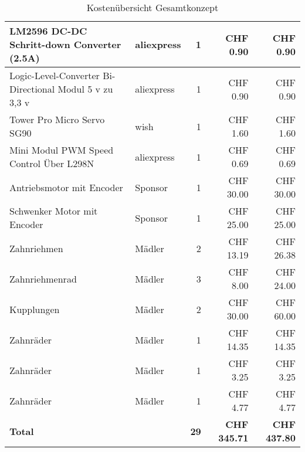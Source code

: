\documentclass[../../main.tex]{subfiles}
\begin{document}
\begin{table}[H]
\begin{tabular}{|p{6cm}|l|r|r|r|}
    LM2596 DC-DC Schritt-down Converter (2.5A)              & aliexpress         & 1               & CHF 0.90            & CHF 0.90              \\ \hline 
    Logic-Level-Converter Bi-Directional Modul 5 v zu 3,3 v & aliexpress         & 1               & CHF 0.90            & CHF 0.90              \\ \hline 
    Tower Pro Micro Servo SG90                              & wish               & 1               & CHF 1.60            & CHF 1.60              \\ \hline 
    Mini Modul PWM Speed Control Über L298N                 & aliexpress         & 1               & CHF 0.69            & CHF 0.69              \\ \hline 
    Antriebsmotor mit Encoder                               & Sponsor            & 1               & CHF 30.00           & CHF 30.00             \\ \hline 
    Schwenker Motor mit Encoder                             & Sponsor            & 1               & CHF 25.00           & CHF 25.00             \\ \hline 
    Zahnriehmen                                             & Mädler             & 2               & CHF 13.19           & CHF 26.38             \\ \hline 
    Zahnriehmenrad                                          & Mädler             & 3               & CHF 8.00            & CHF 24.00             \\ \hline 
    Kupplungen                                              & Mädler             & 2               & CHF 30.00           & CHF 60.00             \\ \hline 
    Zahnräder                                               & Mädler             & 1               & CHF 14.35           & CHF 14.35             \\ \hline 
    Zahnräder                                               & Mädler             & 1               & CHF 3.25            & CHF 3.25              \\ \hline 
    Zahnräder                                               & Mädler             & 1               & CHF 4.77            & CHF 4.77              \\ \hline \hline
    \textbf{Total}                                          & \textbf{}          & \textbf{29}     & \textbf{CHF 345.71} & \textbf{CHF 437.80}   \\ \hline 
    \end{tabular}
    \caption{Kostenübersicht Gesamtkonzept}
    \label{tab:kosten_total}
    \end{table}
\end{document}
